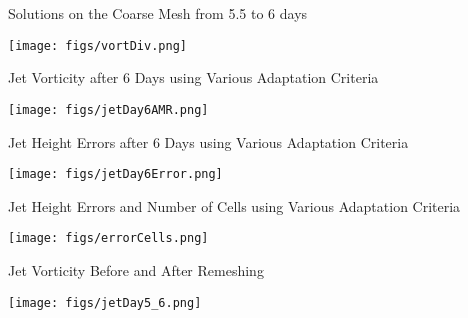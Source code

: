 \begin{slide}
{
   Solutions on the Coarse Mesh from 5.5 to 6 days
}

\centering
\texttt{[image: figs/vortDiv.png]}

\end{slide}

\begin{slide}
{
    Jet Vorticity after 6 Days using Various Adaptation Criteria
}

\centering

\texttt{[image: figs/jetDay6AMR.png]}

\end{slide}

\begin{slide}
{
    Jet Height Errors after 6 Days using Various Adaptation Criteria
}

\centering

\texttt{[image: figs/jetDay6Error.png]}

\end{slide}

\begin{slide}
{
    Jet Height Errors and Number of Cells using Various Adaptation Criteria
}

\centering

\texttt{[image: figs/errorCells.png]}

\end{slide}

\begin{slide}
{
    Jet Vorticity Before and After Remeshing
}

\centering

\texttt{[image: figs/jetDay5\_6.png]}

\end{slide}
